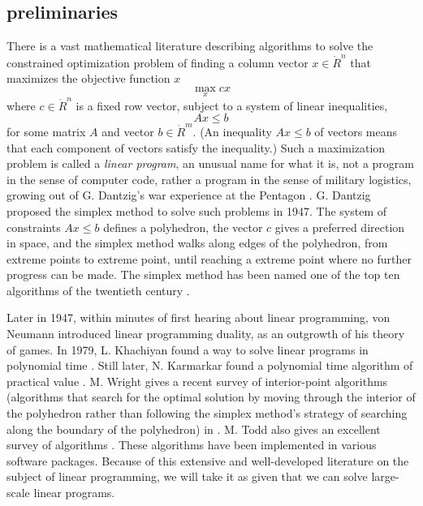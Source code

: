 \subsection{preliminaries}

There is a vast mathematical literature describing algorithms to
solve the constrained optimization problem of finding a column vector
$x\in\ring{R}^n$ that maximizes the objective function $ x$
\begin{equation}\label{eqn:lp1}
\max_{x}  c x
\end{equation}
where $c\in\ring{R}^n$ is a fixed row vector, subject to a system of
linear inequalities,
\begin{equation}\label{eqn:lp2}
A x\le b
\end{equation} 
for some matrix $A$ and vector $b\in \ring{R}^m$.  (An inequality $A
x\le b$ of vectors means that each component of vectors satisfy the
inequality.)  Such a maximization problem is called a {\it linear
  program}, an unusual name for what it is, not a program in the sense
of computer code, rather a program in the sense of military logistics,
growing out of G. Dantzig's war experience at the Pentagon
\cite{Dan91}.  G. Dantzig proposed the simplex method to solve such
problems in 1947.  The system of constraints $A x \le b$ defines a
polyhedron, the vector $c$ gives a preferred direction in space, and
the simplex method walks along edges of the polyhedron, from extreme points to
extreme point, until reaching a extreme point where no further progress can be made.
The simplex method has been named one of the top ten algorithms of the
twentieth century \cite{Cip00}.

Later in 1947, within minutes of first hearing about
linear programming, von Neumann introduced linear programming
duality, as an outgrowth of his theory of games.
In 1979, L. Khachiyan found a way to solve linear programs in
polynomial time \cite{Kha79}.  Still later, 
N. Karmarkar found a polynomial
time algorithm of practical value \cite{Kar84}.  
M. Wright gives a recent survey
of interior-point algorithms (algorithms that search for the 
optimal solution by moving through the interior of the polyhedron
rather than following the simplex method's strategy of searching
along the boundary of the polyhedron) in \cite{Wri05}. 
M. Todd also gives an excellent survey of algorithms \cite{Tod02}.
These algorithms have been implemented in various
software packages.
Because of this extensive and well-developed literature on the
subject of linear programming, we will take it as given that we
can solve large-scale linear programs.


